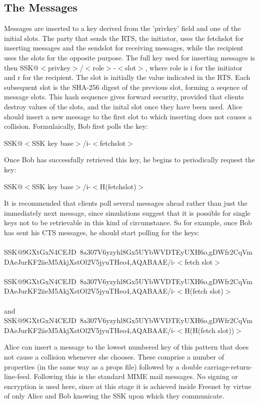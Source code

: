 \documentclass[12pt,a4paper]{article}
\begin{document}
\subsection{The Messages}
Messages are inserted to a key derived from the 'privkey' field and one of the initial slots. The
party that sends the RTS, the initiator, uses the fetchslot for inserting messages and the sendslot
for receiving messages, while the recipient uses the slots for the opposite purpose. The full key
used for inserting messages is then SSK@$<$privkey$>$/$<$role$>$-$<$slot$>$, where role is i for the initiator
and r for the recipient. The slot is initially the value indicated in the RTS. Each subsequent
slot is the SHA-256 digest of the previous slot, forming a seqence of message slots. This hash
sequence gives forward security, provided that clients destroy values of the slots, and the inital
slot once they have been used. Alice should insert a new message to the first slot to which
inserting does not causes a collision. Formulaically, Bob first polls the key:

SSK@$<$SSK key base$>$/i-$<$fetchslot$>$

Once Bob has successfully retrieved this key, he begins to periodically request the key:

SSK@$<$SSK key base$>$/i-$<$H(fetchslot)$>$

It is recommended that clients poll several messages ahead rather than just the immediately next
message, since simulations suggest that it is possible for single keys not to be retrievable in this
kind of circumstance. So for example, once Bob has sent his CTS messages, he should start polling
for the keys: \\
\\
SSK@9GXtGxN4CEJD~8a\-307V6yzyhl8Gx5U\-YbWVDTEyUXH6o,gDWfr2CqVm\-
DAeJurKF2iieM\-5AkjXstOl2V5j\-yuTHeo4,AQABAAE/i-$<$fetch slot$>$ \\
\\
SSK@9GXtGxN4CEJD~8a\-307V6yzyhl8Gx5U\-YbWVDTEyUXH6o,gDWfr2CqVm\-
DAeJurKF2iieM\-5AkjXstOl2V5j\-yuTHeo4,AQABAAE/i-$<$H(fetch slot)$>$ \\
\\
and \\
SSK@9GXtGxN4CEJD~8a\-307V6yzyhl8Gx5U\-YbWVDTEyUXH6o,gDWfr2CqVm\-
DAeJurKF2iieM\-5AkjXstOl2V5j\-yuTHeo4,AQABAAE/i-$<$H(H(fetch slot))$>$

Alice can insert a message to the lowest numbered key of this pattern that does not cause a
collision whenever she chooses. These comprise a number of properties (in the same way as a props
file) followed by a double carriage-return-line-feed. Following this is the standard MIME mail
messages. No signing or encryption is used here, since at this stage it is achieved inside Freenet
by virtue of only Alice and Bob knowing the SSK upon which they communicate.
\end{document}
